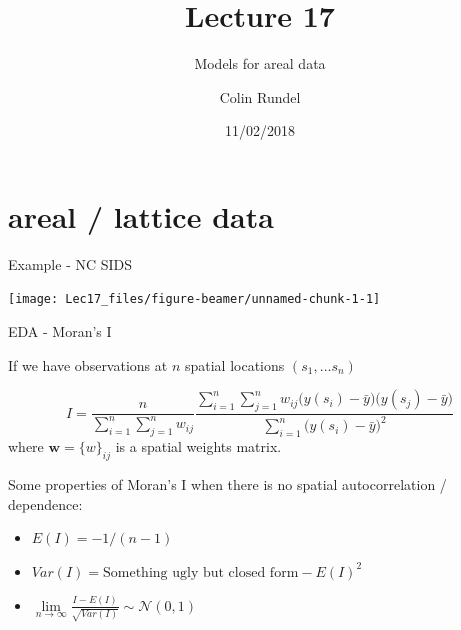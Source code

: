 \documentclass[11pt,ignorenonframetext,]{beamer}
\title{Lecture 17}
\subtitle{Models for areal data}
\author{Colin Rundel}
\date{11/02/2018}
\providecommand{\tightlist}{%
  \setlength{\itemsep}{0pt}\setlength{\parskip}{0pt}}
\begin{document}
\frame{\titlepage}

\hypertarget{areal-lattice-data}{%
\section{areal / lattice data}\label{areal-lattice-data}}

\begin{frame}{Example - NC SIDS}
\protect\hypertarget{example---nc-sids}{}

\begin{center}\texttt{[image: Lec17\_files/figure-beamer/unnamed-chunk-1-1]} \end{center}

\end{frame}

\begin{frame}[t]{EDA - Moran's I}
\protect\hypertarget{eda---morans-i}{}

If we have observations at \(n\) spatial locations \((s_1, \ldots s_n)\)

\[ I = \frac{n}{\sum_{i=1}^n \sum_{j=1}^n w_{ij}} \frac{\sum_{i=1}^n \sum_{j=1}^n w_{ij} \big(y(s_i)-\bar{y}\big)\big(y(s_j)-\bar{y}\big)}{\sum_{i=1}^n \big(y(s_i) - \bar{y}\big)^2} \]
where \(\symbf{w} = \{w\}_{ij}\) is a spatial weights matrix.

\pause

\vspace{3mm}

Some properties of Moran's I when there is no spatial autocorrelation /
dependence:

\begin{itemize}
\tightlist
\item
  \(E(I) = -1 / (n-1)\)
\end{itemize}

\vspace{2mm}

\begin{itemize}
\tightlist
\item
  \(Var(I) = \text{Something ugly but closed form}- E(I)^2\)
\end{itemize}

\vspace{2mm}

\begin{itemize}
\tightlist
\item
  \(\underset{n\to\infty}{\lim} \frac{I - E(I)}{\sqrt{Var(I)}} \sim \mathcal{N}(0,1)\)
\end{itemize}

\end{frame}
\end{document}
